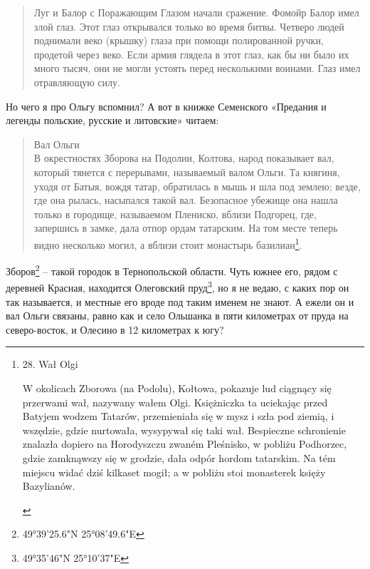 \begin{quotation}
Луг и Балор с Поражающим Глазом начали сражение. Фомойр Балор имел злой глаз. Этот глаз открывался только во время битвы. Четверо людей поднимали веко (крышку) глаза при помощи полированной ручки, продетой через веко. Если армия глядела в этот глаз, как бы ни было их много тысяч, они не могли устоять перед несколькими воинами. Глаз имел отравляющую силу.
\end{quotation}

Но чего я про Ольгу вспомнил? А вот в книжке Семенского «Предания и легенды польские, русские и литовские» читаем\cite[стр. 39]{siem01}:

\begin{quotation}
Вал Ольги\\

В окрестностях Зборова на Подолии, Колтова, народ показывает вал, который тянется с перерывами, называемый валом Ольги. Та княгиня, уходя от Батыя, вождя татар, обратилась в мышь и шла под землею; везде, где она рылась, насыпался такой вал. Безопасное убежище она нашла только в городище, называемом Плениско, вблизи Подгорец, где, запершись в замке, дала отпор ордам татарским. На том месте теперь видно несколько могил, а вблизи стоит монастырь базилиан\footnote{\begin{otherlanguage}{polish}28. Wał Olgi

W okolicach Zborowa (na Podolu), Kołtowa, pokazuje lud ciągnący się przerwami wał, nazywany wałem Olgi. Księżniczka ta uciekając przed Batyjem wodzem Tatarów, przemieniała się w mysz i szła pod ziemią, i wszędzie, gdzie nurtowała, wysypywał się taki wał. Bespieczne schronienie znalazła dopiero na Horodyszczu zwaném Pleśnisko, w pobliżu Podhorzec, gdzie zamknąwszy się w grodzie, dała odpór hordom tatarskim. Na tém miejscu widać dziś kilkaset mogił; a w pobliżu stoi monasterek księży Bazylianów.\end{otherlanguage}}. 
\end{quotation}


Зборов\footnote{49°39'25.6"N 25°08'49.6"E} – такой городок в Тернопольской области. Чуть южнее его, рядом с деревней Красная, находится Олеговский пруд\footnote{49°35'46"N 25°10'37"E}, но я не ведаю, с каких пор он так называется, и местные его вроде под таким именем не знают. А ежели он и вал Ольги связаны, равно как и село Ольшанка в пяти километрах от пруда на северо-восток, и Олесино в 12 километрах к югу?

